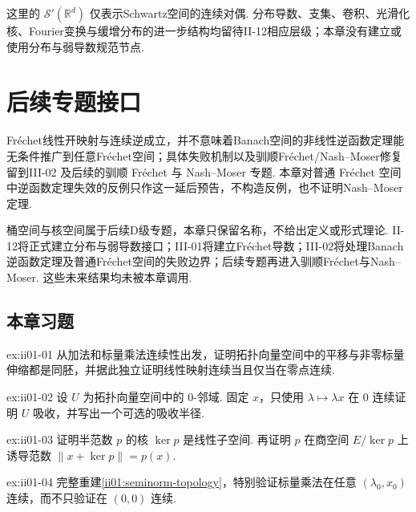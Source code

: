 这里的 \(\displaystyle \mathcal S'(\mathbb R^d)\) 仅表示Schwartz空间的连续对偶. 分布导数、支集、卷积、光滑化核、Fourier变换与缓增分布的进一步结构均留待II-12相应层级；本章没有建立或使用分布与弱导数规范节点.

\section{后续专题接口}\label{sec:ii01-future}

Fr\'echet线性开映射与连续逆成立，并不意味着Banach空间的非线性逆函数定理能无条件推广到任意Fr\'echet空间；具体失败机制以及驯顺Fr\'echet/Nash--Moser修复留到III-02 及后续的驯顺 Fréchet 与 Nash--Moser 专题. 本章对普通 Fréchet 空间中逆函数定理失效的反例只作这一延后预告，不构造反例，也不证明Nash--Moser定理.

桶空间与核空间属于后续D级专题，本章只保留名称，不给出定义或形式理论. II-12将正式建立分布与弱导数接口；III-01将建立Fr\'echet导数；III-02将处理Banach逆函数定理及普通Fr\'echet空间的失败边界；后续专题再进入驯顺Fr\'echet与Nash--Moser. 这些未来结果均未被本章调用.

\subsection*{本章习题}\label{sec:ii01-exercises}

\begin{FAExercise}[平移与伸缩同胚]{ex:ii01-01}
从加法和标量乘法连续性出发，证明拓扑向量空间中的平移与非零标量伸缩都是同胚，并据此独立证明线性映射连续当且仅当在零点连续.
\end{FAExercise}

\begin{FAExercise}[零邻域吸收性]{ex:ii01-02}
设 \(\displaystyle U\) 为拓扑向量空间中的 \(\displaystyle0\)-邻域. 固定 \(\displaystyle x\)，只使用 \(\displaystyle \lambda\mapsto\lambda x\) 在 \(\displaystyle0\) 连续证明 \(\displaystyle U\) 吸收，并写出一个可选的吸收半径.
\end{FAExercise}

\begin{FAExercise}[半范数核]{ex:ii01-03}
证明半范数 \(\displaystyle p\) 的核 \(\displaystyle \ker p\) 是线性子空间. 再证明 \(\displaystyle p\) 在商空间 \(\displaystyle E/\ker p\) 上诱导范数 \(\displaystyle \|x+\ker p\|=p(x)\).
\end{FAExercise}

\begin{FAExercise}[半范数向量拓扑]{ex:ii01-04}
完整重建\autoref{ii01:seminorm-topology}，特别验证标量乘法在任意 \(\displaystyle(\lambda_0,x_0)\) 连续，而不只验证在 \(\displaystyle(0,0)\) 连续.
\end{FAExercise}

